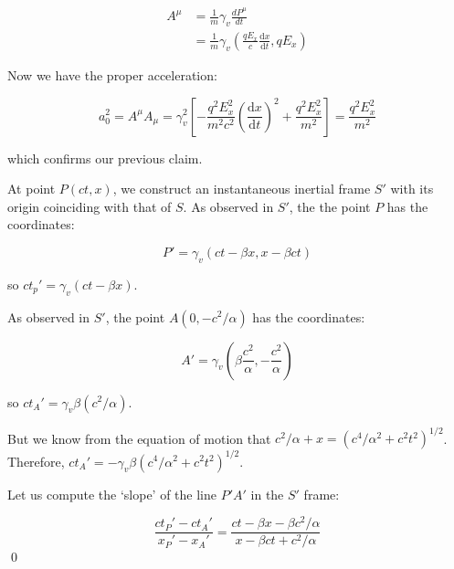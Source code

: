 \documentclass[12pt]{article}
\begin{document}
\begin{equation}
    \begin{split}
        A^{\mu} &= \frac{1}{m} \gamma_{v} \frac{dP^{\mu}}{dt} \\
        &= \frac{1}{m} \gamma_{v} \left( \frac{qE_{x}}{c} \frac{\mathrm{d}x}{\mathrm{d}t}, qE_{x} \right)
    \end{split}
\end{equation}

Now we have the proper acceleration:

\begin{equation}
    a_{0}^{2} = A^{\mu} A_{\mu} = \gamma_{v}^{2} \left[ -\frac{q^{2}E_{x}^{2}}{m^{2}c^{2}} \left( \frac{\mathrm{d}x}{\mathrm{d}t} \right)^{2} + \frac{q^{2}E_{x}^{2}}{m^{2}} \right] = \frac{q^{2}E_{x}^{2}}{m^{2}}
\end{equation}

which confirms our previous claim.

At point $P(ct, x)$, we construct an instantaneous inertial frame $S'$ with its origin coinciding with that of $S$. As observed in $S'$, the the point $P$ has the coordinates:

\begin{equation}
    P' = \gamma_{v} (ct - \beta x, x - \beta ct)
\end{equation}

so $ct_{p}' = \gamma_{v} (ct - \beta x)$.

As observed in $S'$, the point $A(0, -c^{2}/\alpha)$ has the coordinates:

\begin{equation}
    A' = \gamma_{v} \left( \beta \frac{c^{2}}{\alpha}, -\frac{c^{2}}{\alpha} \right)
\end{equation}

so $ct_{A}' = \gamma_{v} \beta (c^{2}/\alpha)$.

But we know from the equation of motion that $c^{2}/\alpha + x = (c^{4}/\alpha^{2} + c^{2}t^{2})^{1/2}$. Therefore, $ct_{A}' = -\gamma_{v} \beta (c^{4}/\alpha^{2} + c^{2}t^{2})^{1/2}$.

Let us compute the `slope' of the line $P'A'$ in the $S'$ frame:

\begin{equation}
    \frac{ct_{P}' - ct_{A}'}{x_{P}' - x_{A}'} = \frac{ct - \beta x - \beta c^{2}/\alpha}{x - \beta ct + c^{2}/\alpha}
\end{equation}
\qed


\end{document}
